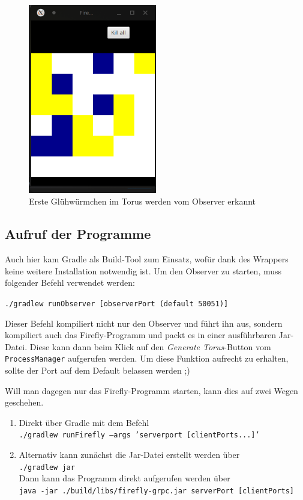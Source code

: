 \documentclass[12pt]{article}
\begin{document}
\begin{figure}[H]
	\centering
	\includegraphics[width=0.5\textwidth]{./img/screenshot_observer_torus}
	\caption{Erste Glühwürmchen im Torus werden vom Observer erkannt}
\end{figure}

\subsection*{Aufruf der Programme}
Auch hier kam Gradle als Build-Tool zum Einsatz, wofür dank des Wrappers keine weitere Installation notwendig ist. Um den Observer zu starten, muss folgender Befehl verwendet werden:

\texttt{./gradlew runObserver [observerPort (default 50051)]}

Dieser Befehl kompiliert nicht nur den Observer und führt ihn aus, sondern kompiliert auch das Firefly-Programm und packt es in einer ausführbaren Jar-Datei. Diese kann dann beim Klick auf den \emph{Generate Torus}-Button vom \texttt{ProcessManager} aufgerufen werden. Um diese Funktion aufrecht zu erhalten, sollte der Port auf dem Default belassen werden ;)

Will man dagegen nur das Firefly-Programm starten, kann dies auf zwei Wegen geschehen.

\begin{enumerate}
	\item Direkt über Gradle mit dem Befehl\\ \texttt{./gradlew runFirefly --args 'serverport [clientPorts...]'}
	\item Alternativ kann zunächst die Jar-Datei erstellt werden über \\ \texttt{./gradlew jar}\\
	Dann kann das Programm direkt aufgerufen werden über\\ \texttt{java -jar ./build/libs/firefly-grpc.jar serverPort [clientPorts]}
\end{enumerate}
\end{document}
